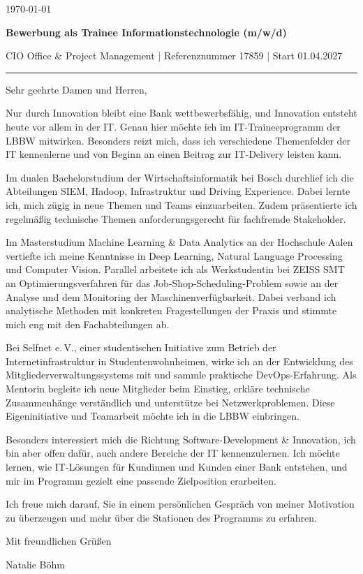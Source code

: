 \documentclass[11pt,a4paper]{article}
\newcommand{\Briefdatum}{\today}
\begin{document}
\color{black}

{\raggedleft \Briefdatum\par}
\vspace{5mm}
{\large\bfseries\textcolor{CVPrimary}{Bewerbung als Trainee Informationstechnologie (m/w/d)}}\par
{\small CIO Office \& Project Management | Referenznummer 17859 | Start 01.04.2027}\par
{\color{CVAccent}\rule{\linewidth}{0.6pt}}\par
\vspace{1mm}

Sehr geehrte Damen und Herren,

Nur durch Innovation bleibt eine Bank wettbewerbsfähig, und Innovation entsteht heute vor allem in der IT. Genau hier möchte ich im IT-Traineeprogramm der LBBW mitwirken. Besonders reizt mich, dass ich verschiedene Themenfelder der IT kennenlerne und von Beginn an einen Beitrag zur IT-Delivery leisten kann.

Im dualen Bachelorstudium der Wirtschaftsinformatik bei Bosch durchlief ich die Abteilungen SIEM, Hadoop, Infrastruktur und Driving Experience. Dabei lernte ich, mich zügig in neue Themen und Teams einzuarbeiten. Zudem präsentierte ich regelmäßig technische Themen anforderungsgerecht für fachfremde Stakeholder. 

Im Masterstudium Machine Learning \& Data Analytics an der Hochschule Aalen vertiefte ich meine Kenntnisse in Deep Learning, Natural Language Processing und Computer Vision. Parallel arbeitete ich als Werkstudentin bei ZEISS SMT an Optimierungsverfahren für das Job-Shop-Scheduling-Problem sowie an der Analyse und dem Monitoring der Maschinenverfügbarkeit. Dabei verband ich analytische Methoden mit konkreten Fragestellungen der Praxis und stimmte mich eng mit den Fachabteilungen ab.

Bei Selfnet e.\,V., einer studentischen Initiative zum Betrieb der Internetinfrastruktur in Studentenwohnheimen, wirke ich an der Entwicklung des Mitgliederverwaltungssystems mit und sammle praktische DevOps-Erfahrung. Als Mentorin begleite ich neue Mitglieder beim Einstieg, erkläre technische Zusammenhänge verständlich und unterstütze bei Netzwerkproblemen. Diese Eigeninitiative und Teamarbeit möchte ich in die LBBW einbringen.

Besonders interessiert mich die Richtung Software-Development \& Innovation, ich bin aber offen dafür, auch andere Bereiche der IT kennenzulernen. Ich möchte lernen, wie IT-Lösungen für Kundinnen und Kunden einer Bank entstehen, und mir im Programm gezielt eine passende Zielposition erarbeiten.

Ich freue mich darauf, Sie in einem persönlichen Gespräch von meiner Motivation zu überzeugen und mehr über die Stationen des Programms zu erfahren.

Mit freundlichen Grüßen

\vspace{6mm}
Natalie Böhm
\end{document}
